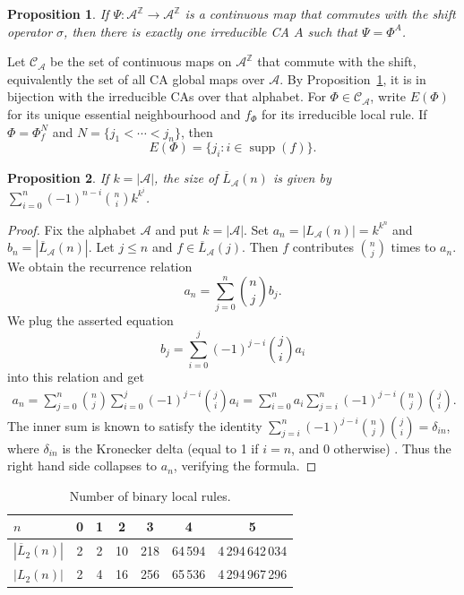 \documentclass[11pt,a4paper]{article}
\newenvironment{revision}{\color{blue}}{}
\newenvironment{revision}{\color{black}}{}
\newcommand{\locmark}[1]{\label{#1}\linelabel{line:#1}}
\newcommand{\supp}{\mathop{\mathrm{supp}}}
\newtheorem{prop}{Proposition}
\begin{document}
\begin{prop}
\label{prop:eq-cont}
If  $\Psi: \mathcal{A}^\mathbb{Z} \to \mathcal{A}^\mathbb{Z}$ is a continuous map that commutes with the shift operator $\sigma$,
then there is exactly one irreducible CA $A$ such that $\Psi = \Phi^A$.
\end{prop}
\begin{revision}
\locmark{loc:essential}
Let $\mathcal C_{\mathcal A}$ be the set of continuous maps on
$\mathcal A^{\mathbb Z}$ that commute with the shift, equivalently
the set of all CA global maps over $\mathcal A$.
By Proposition~\ref{prop:eq-cont}, it is in bijection with the irreducible
CAs over that alphabet.
For $\Phi\in\mathcal C_{\mathcal A}$, write $E(\Phi)$ for its unique
essential neighbourhood and $f_\Phi$ for its irreducible local rule.
If $\Phi=\Phi_f^N$ and $N=\{j_1<\cdots<j_n\}$, then
\[
E(\Phi)=\{j_i:i\in\supp(f)\}.
\]

\end{revision}

\begin{prop}\label{prop:inclusion}
If $k=|\mathcal{A}|$, the size of $\overline{L}_\mathcal{A}(n)$ is given by $\sum_{i=0}^n (-1)^{n-i} \binom{n}{i} k^{k^i}$.
\end{prop}
\begin{proof}
Fix the alphabet $\mathcal{A}$ and put $k = |\mathcal{A}|$.
Set $a_n = |L_\mathcal{A}(n)| = k^{k^n}$ and $b_n = |\overline{L}_\mathcal{A}(n)|$.
Let $j \leq n$ and $f \in \overline{L}_\mathcal{A}(j)$.
Then $f$ contributes $\binom{n}{j}$ times to $a_n$.
We obtain the recurrence relation
\[
a_n = \sum_{j=0}^n \binom{n}{j} b_j.
\]
We plug the asserted equation
\[
b_j = \sum_{i=0}^j (-1)^{j-i} \binom{j}{i} a_i
\] into this relation and get
\begin{eqnarray*}
a_n = \sum_{j=0}^n \binom{n}{j} \sum_{i=0}^j (-1)^{j-i} \binom{j}{i} a_i
= \sum_{i=0}^n a_i \sum_{j=i}^n (-1)^{j-i} \binom{n}{j} \binom{j}{i}.
\end{eqnarray*}
The inner sum is known to satisfy the identity $\sum_{j=i}^n (-1)^{j-i} \binom{n}{j} \binom{j}{i} = \delta_{in}$, where $\delta_{in}$ is the Kronecker delta (equal to 1 if $i=n$, and 0 otherwise) \cite[p.~169]{Graham94}.
Thus the right hand side collapses to $a_n$, verifying the formula.
\end{proof}

\begin{table}
\begin{center}
\caption{Number of binary local rules.}
\label{tab:irr}
\begin{tabular}{|l|c|c|c|c|c|c|} \hline
$n$       & 0 & 1 & 2  & 3   & 4       & 5 \\ \hline
$|\overline{L}_2(n)|$   & 2 & 2 & 10 & 218 & 64\,594 & 4\,294\,642\,034\\ \hline
$|L_2(n)|$              & 2 & 4 & 16 & 256 & 65\,536 & 4\,294\,967\,296\\ \hline
\end{tabular}
\end{center}
\end{table}
\end{document}
